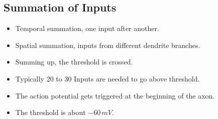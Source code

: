 \documentclass[a4paper, 12pt]{article}
\begin{document}
\subsection{Summation of Inputs}
\begin{itemize}[noitemsep,nolistsep]
	\item Temporal summation, one input after another.
	\item Spatial summation, inputs from different dendrite branches.
	\item Summing up, the threshold is crossed.
	\item Typically 20 to 30 Inputs are needed to go above threshold.
	\item The action potential gets triggered at the beginning of the axon.
	\item The threshold is about $-60\,mV$.
\end{itemize}
\end{document}
